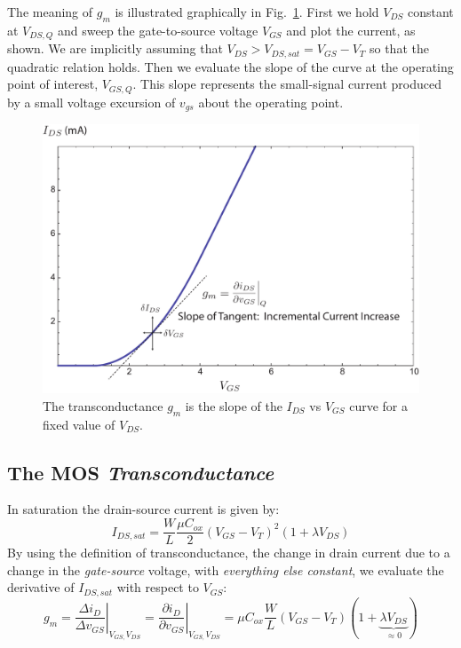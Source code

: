 The meaning of $g_m$ is illustrated graphically in Fig.~\ref{fig:id_vgs_slope}.  First we hold $V_{DS}$ constant at $V_{DS,Q}$ and sweep the gate-to-source voltage $V_{GS}$ and plot the current, as shown.   We are implicitly assuming that  $V_{DS} > V_{DS,sat} = V_{GS} - V_T$ so that the quadratic relation holds.  Then we evaluate the slope of the curve at the operating point of interest, $V_{GS,Q}$.  This slope represents the small-signal current produced by a small voltage excursion of $v_{gs}$ about the operating point.


\begin{figure}[tb]
\begin{center}
\includegraphics[width=.75\columnwidth]{id_vgs_slope}
\end{center}
\caption{The transconductance $g_m$ is the slope of the $I_{DS}$ vs $V_{GS}$ curve for a fixed value of $V_{DS}$.  } \label{fig:id_vgs_slope}
\end{figure}

 



\subsection{The MOS \textit{Transconductance}}

In saturation the drain-source current is given by:
\begin{equation}
	{I_{DS,sat}} = \frac{W}{L}\frac{{\mu {C_{ox}}}}{2}{({V_{GS}} - {V_T})^2}(1 + \lambda {V_{DS}})
	\label{eq:ids}
\end{equation} 
%
By using the definition of transconductance, the change in drain current due to a change in the \textit{gate-source} voltage, with \textit{everything else constant}, we evaluate the derivative of $I_{DS,sat}$ with respect to $V_{GS}$:
%
\begin{equation}
	{g_m} = {\left. {\frac{{\Delta {i_D}}}{{\Delta {v_{GS}}}}} \right|_{{V_{GS,}}{V_{DS}}}} = {\left. {\frac{{\partial {i_D}}}{{\partial {v_{GS}}}}} \right|_{{V_{GS,}}{V_{DS}}}} 
= \mu {C_{ox}}\frac{W}{L}({V_{GS}} - {V_T})(1 +\underbrace{ \lambda {V_{DS}}}_{\approx 0})
\end{equation}
%


